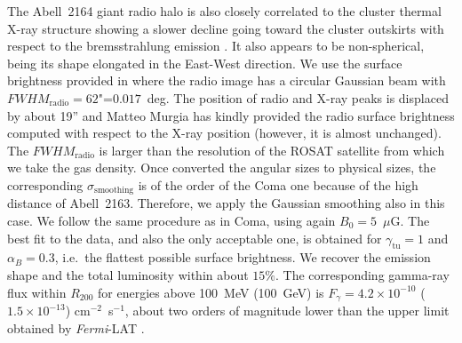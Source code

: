 \documentclass[traditabstract]{aa}
\newcommand{\rmn}{\mathrm}
\begin{document}
The Abell~2164 giant radio halo is also closely correlated to the cluster thermal X-ray structure showing a slower decline going toward the cluster outskirts with respect to the bremsstrahlung emission \citep{2001A&A...373..106F}. It also appears to be non-spherical, being its shape elongated in the East-West direction. 
We use the surface brightness provided in \cite{2009A&A...499..679M} where the radio image has a circular Gaussian beam with $FWHM_{\rmn{radio}}=62$"=$0.017$~deg. The position of radio and X-ray peaks is displaced by about 19'' and Matteo Murgia has kindly provided the radio surface brightness computed with respect to the \cite{2002ApJ...567..716R} X-ray position (however, it is almost unchanged). The $FWHM_{\rmn{radio}}$ is larger than the resolution of the ROSAT satellite from which we take the gas density. Once converted the angular sizes to physical sizes, the corresponding $\sigma_{\rmn{smoothing}}$ is of the order of the Coma one because of the high distance of Abell~2163. Therefore, we apply the Gaussian smoothing also in this case. 
%
We follow the same procedure as in Coma, using again $B_{0}=5$~$\mu$G. The best fit to the data, and also the only acceptable one, is obtained for $\gamma_{\rmn{tu}}=1$ and $\alpha_B=0.3$, i.e.~the flattest possible surface brightness. We recover the emission shape and the total luminosity within about $15\%$. The corresponding gamma-ray flux within $R_{200}$ for energies above 100~MeV (100~GeV) is $F_{\gamma} = 4.2 \times 10^{-10}$ ($1.5 \times 10^{-13}$) cm$^{-2}$~s$^{-1}$, about two orders of magnitude lower than the upper limit obtained by \emph{Fermi}-LAT \citep{2010ApJ...717L..71A}.
\end{document}
